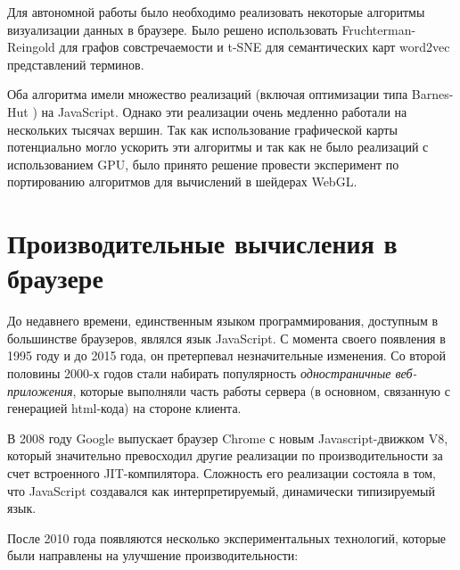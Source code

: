 Для автономной работы было необходимо реализовать некоторые алгоритмы визуализации данных в браузере. Было решено использовать Fruchterman-Reingold для графов совстречаемости и t-SNE для семантических карт word2vec представлений терминов.

Оба алгоритма имели множество реализаций (включая оптимизации типа Barnes-Hut \cite{barnes_hut}) на JavaScript. Однако эти реализации очень медленно работали на нескольких тысячах вершин. Так как использование графической карты потенциально могло ускорить эти алгоритмы и так как не было реализаций с использованием GPU, было принято решение провести эксперимент по портированию алгоритмов для вычислений в шейдерах WebGL.

\section{Производительные вычисления в браузере}

До недавнего времени, единственным языком программирования, доступным в большинстве браузеров, являлся язык JavaScript. С момента своего появления в 1995 году и до 2015 года, он претерпевал незначительные изменения. Со второй половины 2000-х годов стали набирать популярность {\itshape одностраничные веб-приложения}, которые выполняли часть работы сервера (в основном, связанную с генерацией html-кода) на стороне клиента.

В 2008 году Google выпускает браузер Chrome с новым Javascript-движком V8, который значительно превосходил другие реализации по производительности за счет встроенного JIT-компилятора. Сложность его реализации состояла в том, что JavaScript создавался как интерпретируемый, динамически типизируемый язык.

После 2010 года появляются несколько экспериментальных технологий, которые были направлены на улучшение производительности:

